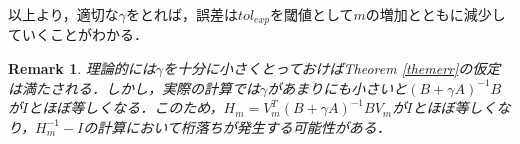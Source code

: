 \documentclass[a4paper,12pt]{nodlabpabw}
\newtheorem{thm}{Theorem}[chapter]
\newtheorem{rmk}{Remark}[chapter]
\newtheorem{proof}{Proof:}
\newenvironment{Eqnarray}%
{\arraycolsep 0.14em\begin{eqnarray}}{\end{eqnarray}}
\begin{document}
以上より，適切な$\gamma$をとれば，誤差は$tol_{exp}$を閾値として$m$の増加とともに減少していくことがわかる．
\begin{rmk}
理論的には$\gamma$を十分に小さくとっておけばTheorem \ref{themerr}の仮定は満たされる．しかし，実際の計算では$\gamma$があまりにも小さいと$(B+\gamma A)^{-1}B$が$I$とほぼ等しくなる．このため，$H_m=V_m^T(B+\gamma A)^{-1}BV_m$が$I$とほぼ等しくなり，$H^{-1}_m-I$の計算において桁落ちが発生する可能性がある．
\end{rmk}
%
\end{document}
